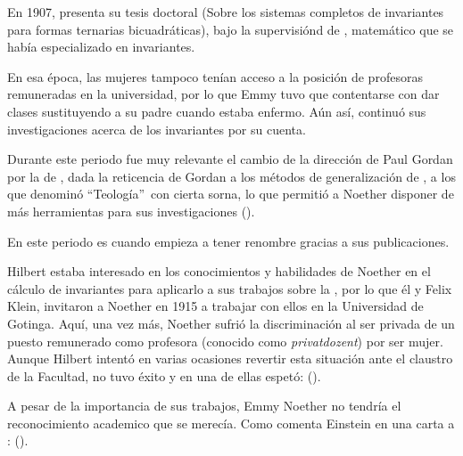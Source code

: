 En 1907, presenta su tesis doctoral  (Sobre los sistemas completos de invariantes para formas ternarias bicuadráticas), bajo la supervisiónd de , matemático que se había especializado en invariantes.

En esa época, las mujeres tampoco tenían acceso a la posición de profesoras remuneradas en la universidad, por lo que Emmy tuvo que contentarse con dar clases sustituyendo a su padre cuando estaba enfermo.
Aún así, continuó sus investigaciones acerca de los invariantes por su cuenta.

Durante este periodo fue muy relevante el cambio de la dirección de Paul Gordan por la de , dada la reticencia de Gordan a los métodos de generalización de , a los que denominó \textquotedblleft Teología\textquotedblright\ con cierta sorna, lo que permitió a Noether disponer de más herramientas para sus investigaciones (\cite{Weyl}).

En este periodo es cuando empieza a tener renombre gracias a sus publicaciones.

Hilbert estaba interesado en los conocimientos y habilidades de Noether en el cálculo de invariantes para aplicarlo a sus trabajos sobre la ,
por lo que él y Felix Klein, invitaron a Noether en 1915 a trabajar con ellos en la Universidad de Gotinga.
Aquí, una vez más, Noether sufrió la discriminación al ser privada de un puesto remunerado como profesora (conocido como \textit{privatdozent}) por ser mujer.
Aunque Hilbert intentó en varias ocasiones revertir esta situación ante el claustro de la Facultad, no tuvo éxito y en una de ellas espetó:  (\cite[332]{Carrasco}).

A pesar de la importancia de sus trabajos, Emmy Noether no tendría el reconocimiento academico que se merecía.
Como comenta Einstein en una carta a :  (\cite{Kimberling}).

